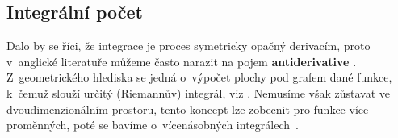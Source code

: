 \documentclass[a4paper, 11pt]{article}
\begin{document}
\subsection*{Integrální počet}
Dalo by se říci, že integrace je proces symetricky opačný derivacím, proto v~anglické literatuře můžeme
často narazit na pojem \textbf{antiderivative} \cite{Britannica_2016_int}. Z~geometrického hlediska se jedná o~výpočet plochy
pod grafem dané funkce,
k~čemuž slouží určitý (Riemannův) integrál, viz \cite{Butek_2005}. Nemusíme však zůstavat ve dvoudimenzionálním prostoru,
tento koncept lze zobecnit pro funkce více proměnných, poté se bavíme o~vícenásobných integrálech~\cite{Valesova_2016}.


\newpage

\renewcommand{\refname}{Literatura}

\end{document}
